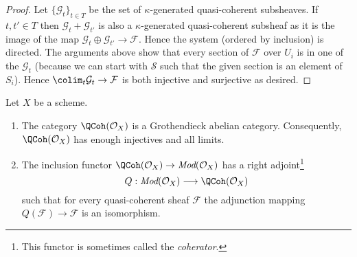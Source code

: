 \begin{proof}
\medskip\noindent
Let $\{\mathcal{G}_t\}_{t \in T}$ be the set of $\kappa$-generated
quasi-coherent subsheaves. If $t, t' \in T$ then
$\mathcal{G}_t + \mathcal{G}_{t'}$ is also a $\kappa$-generated
quasi-coherent subsheaf as it is the image of the map
$\mathcal{G}_t \oplus \mathcal{G}_{t'} \to \mathcal{F}$.
Hence the system (ordered by inclusion) is directed.
The arguments above show that every section of $\mathcal{F}$ over $U_i$
is in one of the $\mathcal{G}_t$ (because we can start with $\mathcal{S}$
such that the given section is an element of $S_i$). Hence
$\colim_t \mathcal{G}_t \to \mathcal{F}$ is both injective and surjective
as desired.
\end{proof}

\begin{proposition}
\label{proposition-coherator}
Let $X$ be a scheme.
\begin{enumerate}
\item The category $\QCoh(\mathcal{O}_X)$ is a Grothendieck
abelian category. Consequently, $\QCoh(\mathcal{O}_X)$
has enough injectives and all limits.
\item The inclusion functor
$\QCoh(\mathcal{O}_X) \to \textit{Mod}(\mathcal{O}_X)$
has a right adjoint\footnote{This functor is sometimes called
the {\it coherator}.}
$$
Q : \textit{Mod}(\mathcal{O}_X) \longrightarrow \QCoh(\mathcal{O}_X)
$$
such that for every quasi-coherent sheaf $\mathcal{F}$ the adjunction mapping
$Q(\mathcal{F}) \to \mathcal{F}$ is an isomorphism.
\end{enumerate}
\end{proposition}

